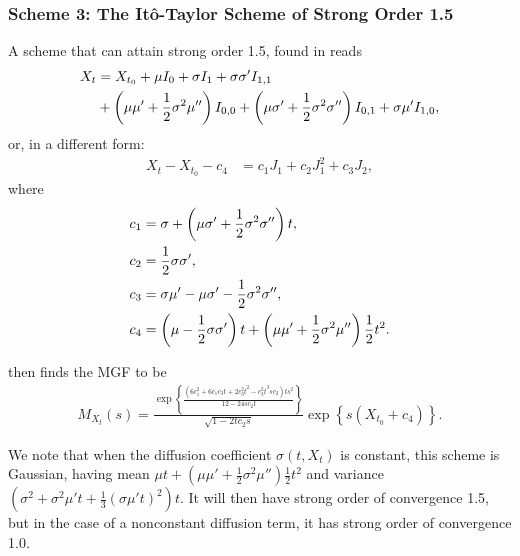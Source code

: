 

\subsubsection{Scheme 3: The Itô-Taylor Scheme of Strong Order 1.5}\label{Chap4 Sec1.3 Order 1.5 scheme}
A scheme that can attain strong order 1.5, found in \citet{preston2012approximation} reads
\begin{align}
X_t&=X_{t_0}+\mu I_0 + \sigma I_1 + \sigma\sigma'I_{1,1}\notag\\ 
&+\left(\mu\mu'+\frac{1}{2}\sigma^2\mu''\right)I_{0,0}+\left(\mu\sigma'+\frac{1}{2}\sigma^2\sigma''\right)I_{0,1}
+\sigma\mu'I_{1,0},
\end{align}
or, in a different form:
\begin{align}
X_t-X_{t_0}-c_4&=c_1J_1+c_2J_1^2+c_3J_2,
\end{align}
where
\begin{align}
c_1&=\sigma+\left(\mu\sigma'+\frac{1}{2}\sigma^2\sigma''\right)t,\notag\\
c_2&=\frac{1}{2}\sigma \sigma',\notag\\
c_3&=\sigma\mu'-\mu\sigma'-\frac{1}{2}\sigma^2\sigma'',\notag\\
c_4&=\left( \mu-\frac{1}{2}\sigma\sigma' \right)t+\left(\mu\mu'+\frac{1}{2}\sigma^2\mu''\right)\frac{1}{2}t^2.
\end{align}
\citep{preston2012approximation}

\citet{preston2012approximation} then finds the MGF to be
\begin{align}
M_{X_t}(s)=\frac{\exp\left\{ \frac{\left(6c_1^2+6c_1c_3t+2c_3^2t^2-c_3^2t^3sc_2\right)ts^2}{12-24sc_2t} \right\}}{\sqrt{1-2tc_2s}}\exp\left\{ s\left(X_{t_0}+c_4\right) \right\}.
\end{align}

We note that when the diffusion coefficient $\sigma(t,X_t)$ is constant, this scheme is Gaussian, having mean 
$\mu t+\left(\mu\mu'+\frac{1}{2}\sigma^2\mu''\right)\frac{1}{2}t^2$ and variance
$\left( \sigma^2+\sigma^2\mu't+\frac{1}{3}(\sigma\mu't)^2 \right)t$. It will then have strong order of convergence 1.5, but in the case of a nonconstant diffusion term, it has strong order of convergence 1.0.














